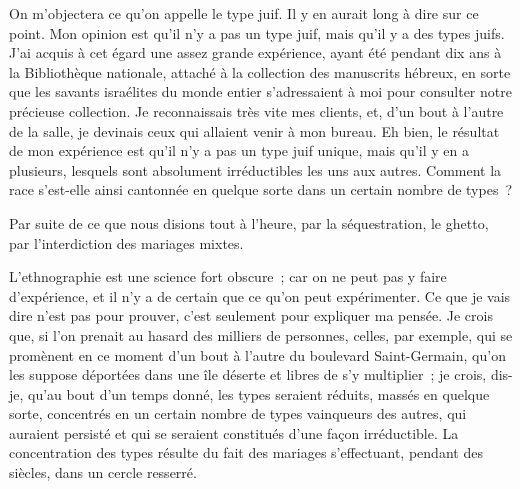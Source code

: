 \documentclass[french,twoside]{book} %
\newcommand\orgName[1]{#1}
\newcommand\placeName[1]{#1}
\begin{document}
On m’objectera ce qu’on appelle le type juif. Il y en aurait long à dire sur ce point. Mon opinion est qu’il n’y a pas un type juif, mais qu’il y a des types juifs. J’ai acquis à cet égard une assez grande expérience, ayant été pendant dix ans à la {\orgName Bibliothèque nationale}, attaché à la collection des manuscrits hébreux, en sorte que les savants israélites du monde entier s’adressaient à moi pour consulter notre précieuse collection. Je reconnaissais très vite mes clients, et, d’un bout à l’autre de la salle, je devinais ceux qui allaient venir à mon bureau. Eh bien, le résultat de mon expérience est qu’il n’y a pas un type juif unique, mais qu’il y en a plusieurs, lesquels sont absolument irréductibles les uns aux autres. Comment la race s’est-elle ainsi cantonnée en quelque sorte dans un certain nombre de types ?\par
Par suite de ce que nous disions tout à l’heure, par la séquestration, le ghetto, par l’interdiction des mariages mixtes.\par
L’ethnographie est une science fort obscure ; car on ne peut pas y faire d’expérience, et il n’y a de certain que ce qu’on peut expérimenter. Ce que je vais dire n’est pas pour prouver, c’est seulement pour expliquer ma pensée. Je crois que, si l’on prenait au hasard des milliers de personnes, celles, par exemple, qui se promènent en ce moment d’un bout à l’autre du {\placeName boulevard Saint-Germain}, qu’on les suppose déportées dans une île déserte et libres de s’y multiplier ; je crois, dis-je, qu’au bout d’un temps donné, les types seraient réduits, massés en quelque sorte, concentrés en un certain nombre de types vainqueurs des autres, qui auraient persisté et qui se seraient constitués d’une façon irréductible. La concentration des types résulte du fait des mariages s’effectuant, pendant des siècles, dans un cercle resserré.\par
\end{document}
